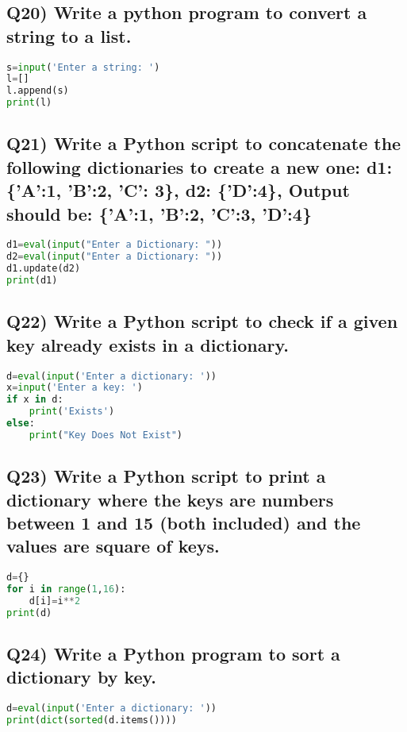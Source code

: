 \documentclass{article}
\begin{document}
\subsection*{Q20) Write a python program to convert a string to a list.}
\begin{lstlisting}[language=Python]
s=input('Enter a string: ')
l=[]
l.append(s)
print(l)
\end{lstlisting}

\subsection*{Q21) Write a Python script to concatenate the following dictionaries to create a new one: d1: \{'A':1, 'B':2, 'C': 3\}, d2: \{'D':4\}, Output should be: \{'A':1, 'B':2, 'C':3, 'D':4\}}
\begin{lstlisting}[language=Python]
d1=eval(input("Enter a Dictionary: "))
d2=eval(input("Enter a Dictionary: "))
d1.update(d2)
print(d1)
\end{lstlisting}

\subsection*{Q22) Write a Python script to check if a given key already exists in a dictionary.}
\begin{lstlisting}[language=Python]
d=eval(input('Enter a dictionary: '))
x=input('Enter a key: ')
if x in d:
    print('Exists')
else:
    print("Key Does Not Exist")
\end{lstlisting}

\subsection*{Q23) Write a Python script to print a dictionary where the keys are numbers between 1 and 15 (both included) and the values are square of keys.}
\begin{lstlisting}[language=Python]
d={}
for i in range(1,16):
    d[i]=i**2
print(d)
\end{lstlisting}

\subsection*{Q24) Write a Python program to sort a dictionary by key.}
\begin{lstlisting}[language=Python]
d=eval(input('Enter a dictionary: '))
print(dict(sorted(d.items())))
\end{lstlisting}
\end{document}
